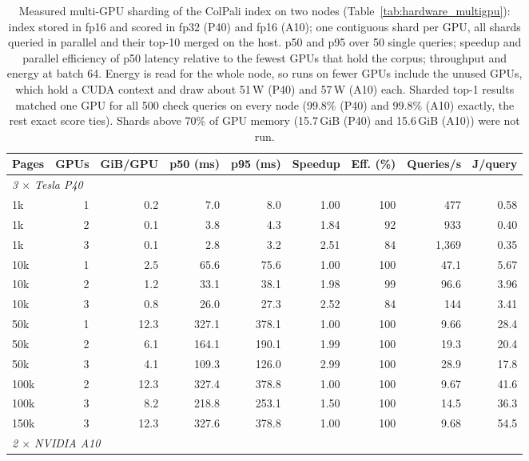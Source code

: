 \begin{table}[t]
\centering
\caption{Measured multi-GPU sharding of the ColPali index on two nodes (Table~\ref{tab:hardware_multigpu}): index stored in fp16 and scored in fp32 (P40) and fp16 (A10); one contiguous shard per GPU, all shards queried in parallel and their top-10 merged on the host. p50 and p95 over 50 single queries; speedup and parallel efficiency of p50 latency relative to the fewest GPUs that hold the corpus; throughput and energy at batch 64. Energy is read for the whole node, so runs on fewer GPUs include the unused GPUs, which hold a CUDA context and draw about 51\,W (P40) and 57\,W (A10) each. Sharded top-1 results matched one GPU for all 500 check queries on every node (99.8\% (P40) and 99.8\% (A10) exactly, the rest exact score ties). Shards above 70\% of GPU memory (15.7\,GiB (P40) and 15.6\,GiB (A10)) were not run.}
\label{tab:multi_gpu}
\begin{adjustbox}{max width=\linewidth}
\begin{tabular}{lrrrrrrrr}
\toprule
\textbf{Pages} & \textbf{GPUs} & \textbf{GiB/GPU} & \textbf{p50 (ms)} & \textbf{p95 (ms)} & \textbf{Speedup} & \textbf{Eff. (\%)} & \textbf{Queries/s} & \textbf{J/query} \\
\midrule
\multicolumn{9}{l}{\emph{3 $\times$ Tesla P40}} \\
1k & 1 & 0.2 & 7.0 & 8.0 & 1.00 & 100 & 477 & 0.58 \\
1k & 2 & 0.1 & 3.8 & 4.3 & 1.84 & 92 & 933 & 0.40 \\
1k & 3 & 0.1 & 2.8 & 3.2 & 2.51 & 84 & 1,369 & 0.35 \\
10k & 1 & 2.5 & 65.6 & 75.6 & 1.00 & 100 & 47.1 & 5.67 \\
10k & 2 & 1.2 & 33.1 & 38.1 & 1.98 & 99 & 96.6 & 3.96 \\
10k & 3 & 0.8 & 26.0 & 27.3 & 2.52 & 84 & 144 & 3.41 \\
50k & 1 & 12.3 & 327.1 & 378.1 & 1.00 & 100 & 9.66 & 28.4 \\
50k & 2 & 6.1 & 164.1 & 190.1 & 1.99 & 100 & 19.3 & 20.4 \\
50k & 3 & 4.1 & 109.3 & 126.0 & 2.99 & 100 & 28.9 & 17.8 \\
100k & 2 & 12.3 & 327.4 & 378.8 & 1.00 & 100 & 9.67 & 41.6 \\
100k & 3 & 8.2 & 218.8 & 253.1 & 1.50 & 100 & 14.5 & 36.3 \\
150k & 3 & 12.3 & 327.6 & 378.8 & 1.00 & 100 & 9.68 & 54.5 \\
\midrule \multicolumn{9}{l}{\emph{2 $\times$ NVIDIA A10}} \\

\end{tabular}
\end{adjustbox}
\end{table}
